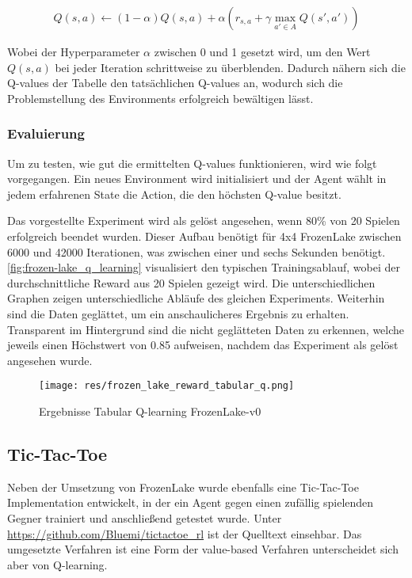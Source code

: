 \documentclass[11pt]{scrartcl}
\begin{document}
\begin{align}
  Q(s, a) \leftarrow (1 - \alpha)Q(s, a) +
  \alpha(r_{s, a} + \gamma \max_{a'\in A}Q(s', a'))
\label{aln:QValueAdapt}
\end{align}
\noindent

Wobei der Hyperparameter $\alpha$ zwischen 0 und 1 gesetzt wird, um den Wert $Q(s, a)$ bei
jeder Iteration schrittweise zu überblenden. Dadurch nähern sich die Q-values der Tabelle
den tatsächlichen Q-values an, wodurch sich die Problemstellung des Environments erfolgreich 
bewältigen lässt.

\subsubsection{Evaluierung}
Um zu testen, wie gut die ermittelten Q-values funktionieren, wird wie folgt vorgegangen.
Ein neues Environment wird initialisiert und der Agent wählt in jedem erfahrenen State die
Action, die den höchsten Q-value besitzt.

Das vorgestellte Experiment wird als gelöst angesehen, wenn 80\% von 20 Spielen erfolgreich
beendet wurden. Dieser Aufbau benötigt für 4x4 FrozenLake zwischen 6000 und 42000
Iterationen, was zwischen einer und sechs Sekunden benötigt.
\autoref{fig:frozen-lake_q_learning} visualisiert den typischen Trainingsablauf, wobei der
durchschnittliche Reward aus 20 Spielen gezeigt wird. Die unterschiedlichen Graphen zeigen
unterschiedliche Abläufe des gleichen Experiments. Weiterhin sind die Daten geglättet, um
ein anschaulicheres Ergebnis zu erhalten. Transparent im Hintergrund sind die nicht
geglätteten Daten zu erkennen, welche jeweils einen Höchstwert von 0.85 aufweisen, nachdem
das Experiment als gelöst angesehen wurde.
\begin{figure}[htp]
\centering
\texttt{[image: res/frozen\_lake\_reward\_tabular\_q.png]}
\caption{Ergebnisse Tabular Q-learning FrozenLake-v0}
\label{fig:frozen-lake_q_learning}
\end{figure}

\subsection{Tic-Tac-Toe}
Neben der Umsetzung von FrozenLake wurde ebenfalls eine Tic-Tac-Toe Implementation
entwickelt, in der ein Agent gegen einen zufällig spielenden Gegner trainiert und
anschließend getestet wurde. Unter \url{https://github.com/Bluemi/tictactoe_rl} ist
der Quelltext einsehbar. Das umgesetzte Verfahren ist eine Form der value-based
Verfahren unterscheidet sich aber von Q-learning.
\end{document}
